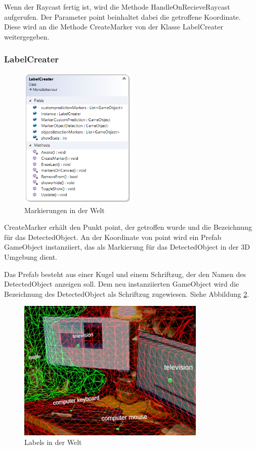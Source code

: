 Wenn der Raycast fertig ist, wird die Methode HandleOnRecieveRaycast aufgerufen. Der Parameter point beinhaltet dabei die getroffene Koordinate.
Diese wird an die Methode CreateMarker von der Klasse LabelCreater weitergegeben.

\subsubsection{LabelCreater}

\begin{figure}
	\centering
	\includegraphics[width=0.5\textwidth]{images/dia_labelcreater.PNG}
	\caption[]{Markierungen in der Welt}
	\label{dia:labelcreater}
\end{figure}

CreateMarker erhält den Punkt point, der getroffen wurde und die Bezeichnung für das DetectedObject. An der Koordinate von point wird ein Prefab GameObject instanziiert, das als Markierung für das DetectedObject in der 3D Umgebung dient.

Das Prefab besteht aus einer Kugel und einem Schriftzug, der den Namen des DetectedObject anzeigen soll. Dem neu instanziierten GameObject wird die Bezeichnung des DetectedObject als Schriftzug zugewiesen. Siehe Abbildung \ref{image:labels}.

\begin{figure}[H]
	\centering
	\includegraphics[width=0.8\textwidth]{images/ML_20201004_19.10.05_2.jpg}
	\caption[]{Labels in der Welt}
	\label{image:labels}
\end{figure}

